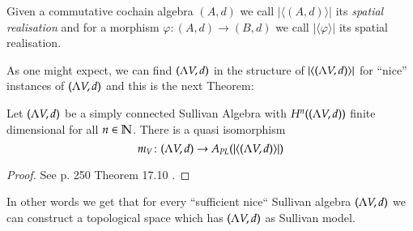  \begin{Definition}
  Given a commutative cochain algebra $(A,d)$ we call $| \langle (A,d) \rangle |$ its \emph{spatial realisation} and for
  a morphism $\varphi \colon (A,d) \to (B,d)$ we call $|\langle \varphi \rangle|$ its spatial realisation.
 \end{Definition}

 As one might expect, we can find $(\Lambda V,d)$ in the structure of  $| \langle (\Lambda V,d) \rangle |$ for ``nice'' 
 instances of $(\Lambda V,d)$ and this is the next Theorem:
 
 \begin{Theorem}
  Let $(\Lambda V,d)$ be a simply connected Sullivan Algebra with $H^n((\Lambda V,d))$ finite dimensional for all $n \in \mathbb{N}$.
  There is a quasi isomorphism
  $$m_V \colon (\Lambda V,d) \to A_{PL}(| \langle (\Lambda V,d) \rangle |)$$
 \end{Theorem}

 \begin{proof}
 See \cite{Felix2001} p. 250 Theorem 17.10 .
  
 \end{proof}
  In other words we get that for every ``sufficient nice`` Sullivan algebra $(\Lambda V,d)$ we can construct 
  a topological space which has $(\Lambda V,d)$ as  Sullivan model.
 
 